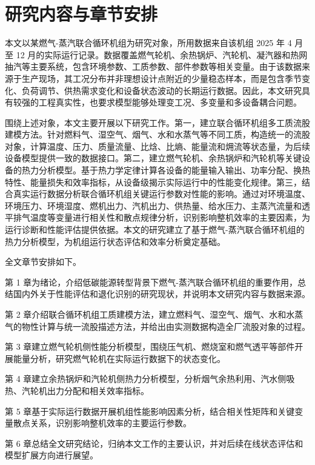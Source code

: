 \section{研究内容与章节安排}

本文以某燃气-蒸汽联合循环机组为研究对象，所用数据来自该机组 2025 年 4 月至 12 月的实际运行记录。数据覆盖燃气轮机、余热锅炉、汽轮机、凝汽器和热网抽汽等主要系统，包含环境参数、工质参数、部件参数等相关变量。由于该数据来源于生产现场，其工况分布并非理想设计点附近的少量稳态样本，而是包含季节变化、负荷调节、供热需求变化和设备状态波动的长期运行数据。因此，本文研究具有较强的工程真实性，也要求模型能够处理变工况、多变量和多设备耦合问题。

围绕上述对象，本文主要开展以下研究工作。第一，建立联合循环机组多工质流股建模方法。针对燃料气、湿空气、烟气、水和水蒸气等不同工质，构造统一的流股对象，计算温度、压力、质量流量、比焓、比熵、能量流和㶲流等状态量，为后续设备模型提供一致的数据接口。第二，建立燃气轮机、余热锅炉和汽轮机等关键设备的热力分析模型。基于热力学定律计算各设备的能量输入输出、功率分配、换热特性、能量损失和效率指标，从设备级揭示实际运行中的性能变化规律。第三，结合真实运行数据分析联合循环机组关键运行参数对性能的影响。通过对环境温度、环境压力、环境湿度、燃机出力、汽机出力、供热量、给水压力、主蒸汽流量和透平排气温度等变量进行相关性和散点规律分析，识别影响整机效率的主要因素，为运行诊断和性能评估提供依据。本文的研究建立了基于燃气-蒸汽联合循环机组的热力分析模型，为机组运行状态评估和效率分析奠定基础。

全文章节安排如下。

第 1 章为绪论，介绍低碳能源转型背景下燃气-蒸汽联合循环机组的重要作用，总结国内外关于性能评估和退化识别的研究现状，并说明本文研究内容与数据来源。

第 2 章介绍联合循环机组工质建模方法，建立燃料气、湿空气、烟气、水和水蒸气的物性计算与统一流股描述方法，并给出由实测数据构造全厂流股对象的过程。

第 3 章建立燃气轮机侧性能分析模型，围绕压气机、燃烧室和燃气透平等部件开展能量分析，研究燃气轮机在实际运行数据下的状态变化。

第 4 章建立余热锅炉和汽轮机侧热力分析模型，分析烟气余热利用、汽水侧吸热、汽轮机出力分配和相关效率指标。

第 5 章基于实际运行数据开展机组性能影响因素分析，结合相关性矩阵和关键变量散点关系，识别影响整机效率的主要运行参数。

第 6 章总结全文研究结论，归纳本文工作的主要认识，并对后续在线状态评估和模型扩展方向进行展望。
